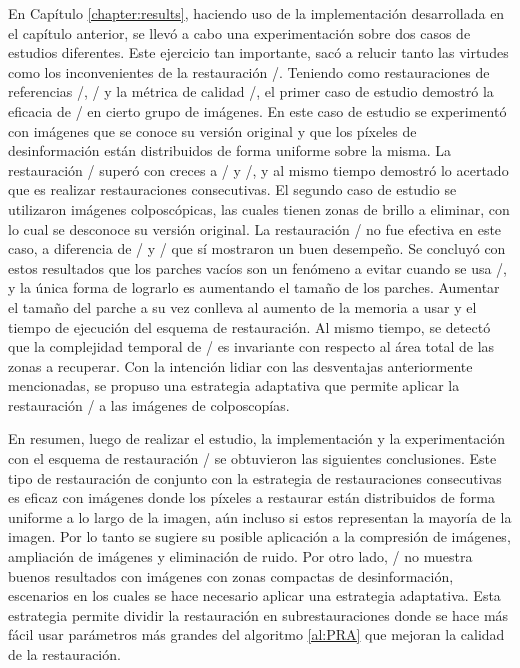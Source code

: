 \begin{conclusions}
En Cap\'itulo \ref{chapter:results}, haciendo uso de la implementaci\'on desarrollada en el cap\'itulo anterior, se llev\'o a cabo una experimentaci\'on sobre dos casos de estudios diferentes. Este ejercicio tan importante, sac\'o a relucir tanto las virtudes como los inconvenientes de la restauraci\'on \SOP/. Teniendo como restauraciones de referencias \TELEA/, \NS/ y la m\'etrica de calidad \PSNR/, el primer caso de estudio demostr\'o la eficacia de \SOP/ en cierto grupo de im\'agenes. En este caso de estudio se experiment\'o con im\'agenes que se conoce su versión original y que los p\'ixeles de desinformaci\'on est\'an distribuidos de forma uniforme sobre la misma. La restauraci\'on \SOP/ super\'o con creces a \TELEA/ y \NS/, y al mismo tiempo demostr\'o lo acertado que es realizar restauraciones consecutivas. El segundo caso de estudio se utilizaron im\'agenes colposc\'opicas, las cuales tienen zonas de brillo a eliminar, con lo cual se desconoce su versi\'on original. La restauraci\'on \SOP/ no fue efectiva en este caso, a diferencia de \TELEA/ y \NS/ que s\'i mostraron un buen desempeño. Se concluy\'o con estos resultados que los parches vac\'ios son un fen\'omeno a evitar cuando se usa \SOP/, y la \'unica forma de lograrlo es aumentando el tamaño de los parches. Aumentar el tamaño del parche a su vez conlleva al aumento de la memoria a usar y el tiempo de ejecuci\'on del esquema de restauraci\'on. Al mismo tiempo, se detect\'o que la complejidad temporal de \SOP/ es invariante con respecto al \'area total de las zonas a recuperar. Con la intenci\'on lidiar con las desventajas anteriormente mencionadas, se propuso una estrategia adaptativa que permite aplicar la restauraci\'on \SOP/ a las im\'agenes de colposcop\'ias.

En resumen, luego de realizar el estudio, la implementaci\'on y la experimentación con el esquema de restauraci\'on \SOP/ se obtuvieron las siguientes conclusiones. Este tipo de restauraci\'on de conjunto con la estrategia de restauraciones consecutivas es eficaz con im\'agenes donde los p\'ixeles a restaurar est\'an distribuidos de forma uniforme a lo largo de la imagen, a\'un incluso si estos representan la mayor\'ia de la imagen. Por lo tanto se sugiere su posible aplicaci\'on a la compresi\'on de im\'agenes, ampliaci\'on de im\'agenes y eliminaci\'on de ruido. Por otro lado, \SOP/ no muestra buenos resultados con im\'agenes con zonas compactas de desinformaci\'on, escenarios en los cuales se hace necesario aplicar una estrategia adaptativa. Esta estrategia permite dividir la restauraci\'on en subrestauraciones donde se hace m\'as f\'acil usar par\'ametros m\'as grandes del algoritmo \ref{al:PRA} que mejoran la calidad de la restauraci\'on.


\end{conclusions}
